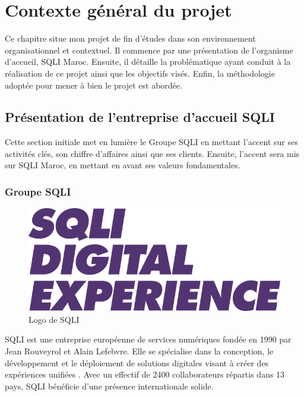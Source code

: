 \chapter{Contexte général du projet}
\label{chap:Contexte général du projet}



Ce chapitre situe mon projet de fin d’études dans son environnement organisationnel et contextuel. Il commence par une présentation de l’organisme d’accueil, SQLI Maroc. Ensuite, il détaille la problématique ayant conduit à la réalisation de ce projet ainsi que les objectifs visés. Enfin, la méthodologie adoptée pour mener à bien le projet est abordée.

\newpage


\section{Présentation de l’entreprise d’accueil SQLI}

Cette section initiale met en lumière le Groupe SQLI en mettant l’accent sur ses activités clés, son
chiffre d’affaires ainsi que ses clients. Ensuite, l'accent sera mis sur SQLI Maroc, en mettant en avant ses valeurs fondamentales.

\subsection{Groupe SQLI}

\begin{figure}[h]
    \centering
    \includegraphics[scale=0.7]{Logos/SQLI_LOGO.png} %
    \caption{Logo de SQLI \cite{SQLI}}
    \label{fig:LogoSQLI}
\end{figure}

SQLI est une entreprise européenne de services numériques fondée en 1990 par Jean Rouveyrol et Alain Lefebvre. Elle se spécialise dans la conception, le développement et le déploiement de solutions digitales
visant à créer des expériences unifiées \cite{SQLI}. Avec un effectif de 2400 collaborateurs répartis dans 13 pays,
SQLI bénéficie d’une présence internationale solide.

